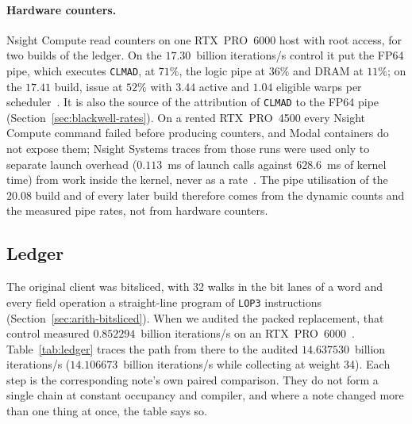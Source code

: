 \paragraph{Hardware counters.} Nsight Compute read counters on one
RTX~PRO~6000 host with root access, for two builds of the ledger. On
the $17.30$~billion iterations/s control it put the FP64 pipe, which
executes \texttt{CLMAD}, at $71\%$, the logic pipe at $36\%$ and DRAM at
$11\%$; on the $17.41$ build, issue at $52\%$ with $3.44$ active and
$1.04$ eligible warps per scheduler~. It is also the source of the
attribution of \texttt{CLMAD} to the FP64 pipe
(Section~\ref{sec:blackwell-rates}). On a rented RTX~PRO~4500 every
Nsight Compute command failed before producing counters, and Modal
containers do not expose them; Nsight Systems traces from those runs
were used only to separate launch overhead ($0.113$~ms of launch calls
against $628.6$~ms of kernel time) from work inside the kernel, never as
a rate~. The pipe utilisation
of the $20.08$ build and of every later build therefore comes from the
dynamic counts and the measured pipe rates, not from hardware counters.

\subsection{Ledger}
\label{sec:ledger}

The original client was bitsliced, with 32 walks in the bit lanes of
a word and every field operation a straight-line program of
\texttt{LOP3} instructions (Section~\ref{sec:arith-bitsliced}). When
we audited the packed replacement, that control measured
$0.852294$~billion iterations/s on an RTX~PRO~6000~.
Table~\ref{tab:ledger} traces the path from there to the audited
$14.637530$~billion iterations/s ($14.106673$~billion iterations/s while collecting at weight 34). Each
step is the corresponding note's own paired comparison. They do not
form a single chain at constant occupancy and compiler, and where a
note changed more than one thing at once, the table says so.


